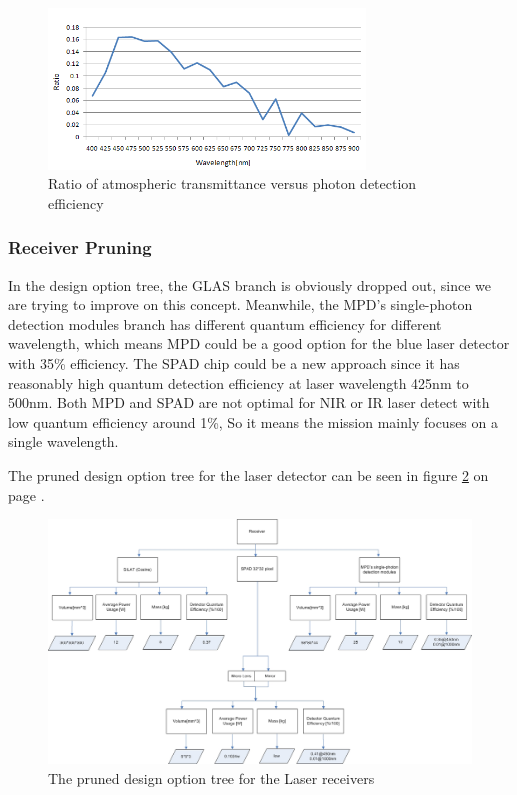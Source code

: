 \begin{figure}[ht!]
\centering
\includegraphics[width=0.75\textwidth]{chapters/img/wavelength_estimation.png}
\caption{Ratio of atmospheric transmittance versus photon detection efficiency}
\label{fig:wavelength_estimation}
\end{figure}

\subsubsection{Receiver Pruning}
\label{TOReceiverP}
In the design option tree, the GLAS branch is obviously dropped out, since we are trying to improve on this concept. Meanwhile, the \ac{MPD}'s single-photon detection modules branch has different quantum efficiency for different wavelength, which means MPD could be a good option for the blue laser detector with 35\% efficiency. The \ac{SPAD} chip could be a new approach since it has reasonably high quantum detection efficiency at laser wavelength 425nm to 500nm. Both \acs{MPD} and \acs{SPAD} are not optimal for \acs{NIR} or \acs{IR} laser detect with low quantum efficiency around 1\%, So it means the mission mainly focuses on a single wavelength.

The pruned design option tree for the laser detector can be seen in figure \ref{fig:PrunedReceiver} on page \pageref{fig:PrunedReceiver}.

\begin{figure}[ht!]
\centering
\includegraphics[width=0.75\textheight, angle=90]{chapters/img/DOTreceiverPruned.jpg}
\caption{The pruned design option tree for the Laser receivers}
\label{fig:PrunedReceiver}
\end{figure}

